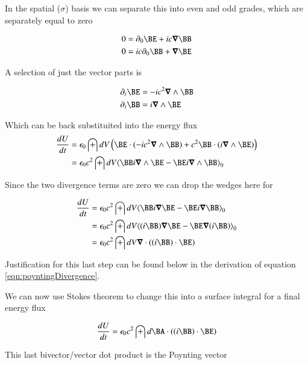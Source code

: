 \documentclass{article}
\begin{document}
In the spatial ($\sigma$) basis we can separate this into even and odd grades, which are separately equal to zero

\begin{align*}
0 &= \partial_0 \BE + ic \spacegrad \BB \\
0 &= ic \partial_0 \BB + \spacegrad \BE 
\end{align*}

A selection of just the vector parts is

\begin{align*}
\partial_t \BE &= - ic^2 \spacegrad \wedge \BB \\
\partial_t \BB &= i\spacegrad \wedge \BE 
\end{align*}

Which can be back substituited into the energy flux
\begin{align*}
\frac{dU}{dt} 
&= \epsilon_0 \int dV \left( \BE \cdot (-i c^2 \spacegrad \wedge \BB) + c^2 \BB \cdot (i \spacegrad \wedge \BE) \right) \\
&= \epsilon_0 c^2 \int dV \gpgradezero{ \BB i \spacegrad \wedge \BE -\BE i \spacegrad \wedge \BB } \\
\end{align*}

Since the two divergence terms are zero we can drop the wedges here for

\begin{align*}
\frac{dU}{dt} 
&= \epsilon_0 c^2 \int dV \gpgradezero{ \BB i \spacegrad \BE -\BE i \spacegrad \BB } \\
&= \epsilon_0 c^2 \int dV \gpgradezero{ (i \BB) \spacegrad \BE -\BE \spacegrad (i\BB) } \\
&= \epsilon_0 c^2 \int dV \spacegrad \cdot ( (i \BB) \cdot \BE ) \\
\end{align*}

Justification for this last step can be found below in the derivation of equation \ref{eqn:poyntingDivergence}.

We can now use Stokes theorem to change this into a surface integral for a final energy flux 

\begin{align*}
\frac{dU}{dt} 
&= \epsilon_0 c^2 \int d\BA \cdot ( (i \BB) \cdot \BE ) \\
\end{align*}

This last bivector/vector dot product is the Poynting vector
\end{document}
